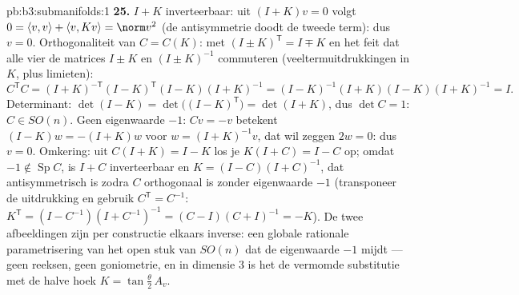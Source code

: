 \begin{solution}{pb:b3:submanifolds:1}
\textbf{25.} $I + K$ inverteerbaar: uit $(I + K)v = 0$ volgt $0 =
\langle v, v\rangle + \langle v, Kv\rangle = \norm v^2$ (de
antisymmetrie doodt de tweede term): dus $v = 0$. Orthogonaliteit
van $C = C(K)$: met $(I \pm K)^{\mathsf T} = I \mp K$ en het feit
dat alle vier de matrices $I \pm K$ en $(I \pm K)^{-1}$
commuteren (veeltermuitdrukkingen in $K$, plus limieten):
\[
C^{\mathsf T}C = (I + K)^{-\mathsf T}(I - K)^{\mathsf T}
(I - K)(I + K)^{-1}
= (I - K)^{-1}(I + K)(I - K)(I + K)^{-1} = I .
\]
Determinant: $\det(I - K) = \det\bigl((I - K)^{\mathsf
T}\bigr) = \det(I + K)$, dus $\det C = 1$: $C \in SO(n)$. Geen
eigenwaarde $-1$: $Cv = -v$ betekent $(I - K)w = -(I + K)w$ voor
$w = (I + K)^{-1}v$, dat wil zeggen $2w = 0$: dus $v = 0$.
Omkering: uit $C(I + K) = I - K$ los je $K(I + C) = I - C$ op;
omdat $-1 \notin \operatorname{Sp}C$, is $I + C$ inverteerbaar en
$K = (I - C)(I + C)^{-1}$, dat antisymmetrisch is zodra $C$
orthogonaal is zonder eigenwaarde $-1$ (transponeer de
uitdrukking en gebruik $C^{\mathsf T} = C^{-1}$: $K^{\mathsf T} =
(I - C^{-1})(I + C^{-1})^{-1} = (C - I)(C + I)^{-1} = -K$). De
twee afbeeldingen zijn per constructie elkaars inverse: een
globale rationale parametrisering van het  open stuk van
$SO(n)$ dat de eigenwaarde $-1$ mijdt --- geen reeksen, geen
goniometrie, en in dimensie $3$ is het de vermomde substitutie
met de halve hoek $K = \tan\frac\theta2\,A_v$.
\end{solution}
